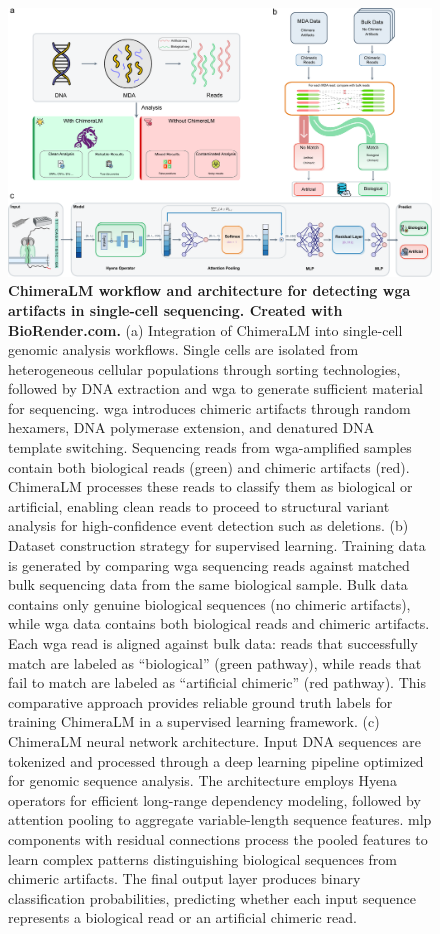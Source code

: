\documentclass[pdflatex,sn-nature]{sn-jnl}%
\theoremstyle{thmstyleone}%
\theoremstyle{thmstyletwo}%
\theoremstyle{thmstylethree}%
\begin{document}
\begin{figure}[!ht]
	\begin{center}
		\includegraphics[width=\textwidth]{final_figures/figure1}
	\end{center}
	\caption{{\bf ChimeraLM workflow and architecture for detecting \gls{wga} artifacts in single-cell sequencing. Created with BioRender.com.}
		(a) Integration of ChimeraLM into single-cell genomic analysis workflows. Single cells are isolated from heterogeneous cellular populations through sorting technologies, followed by DNA extraction and \gls{wga} to generate sufficient material for sequencing. \gls{wga} introduces chimeric artifacts through random hexamers, DNA polymerase extension, and denatured DNA template switching. Sequencing reads from \gls{wga}-amplified samples contain both biological reads (green) and chimeric artifacts (red). ChimeraLM processes these reads to classify them as biological or artificial, enabling clean reads to proceed to structural variant analysis for high-confidence event detection such as deletions.
		(b) Dataset construction strategy for supervised learning. Training data is generated by comparing \gls{wga} sequencing reads against matched bulk sequencing data from the same biological sample. Bulk data contains only genuine biological sequences (no chimeric artifacts), while \gls{wga} data contains both biological reads and chimeric artifacts. Each \gls{wga} read is aligned against bulk data: reads that successfully match are labeled as ``biological'' (green pathway), while reads that fail to match are labeled as ``artificial chimeric'' (red pathway). This comparative approach provides reliable ground truth labels for training ChimeraLM in a supervised learning framework.
		(c) ChimeraLM neural network architecture. Input DNA sequences are tokenized and processed through a deep learning pipeline optimized for genomic sequence analysis. The architecture employs Hyena operators for efficient long-range dependency modeling, followed by attention pooling to aggregate variable-length sequence features. \gls{mlp} components with residual connections process the pooled features to learn complex patterns distinguishing biological sequences from chimeric artifacts. The final output layer produces binary classification probabilities, predicting whether each input sequence represents a biological read or an artificial chimeric read.} \label{fig:figure1}
\end{figure}
\end{document}
